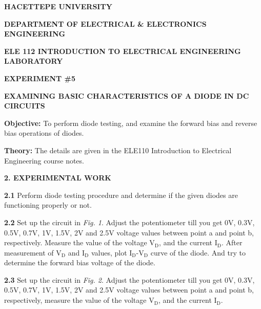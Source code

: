 \documentclass{article}
\begin{document}
\large

{\small \textbf{HACETTEPE UNIVERSITY}}

{\small \textbf{DEPARTMENT OF ELECTRICAL \& ELECTRONICS ENGINEERING}} 

{\small \textbf{ELE 112 INTRODUCTION TO ELECTRICAL ENGINEERING LABORATORY}} 

\vspace{4mm}

{\small \textbf{EXPERIMENT \#5}}

\vspace{4mm}

{\small \textbf{EXAMINING BASIC CHARACTERISTICS OF A DIODE IN DC CIRCUITS}}

\vspace{4mm}

{\textbf{Objective:}}
{To perform diode testing, and examine the forward bias and reverse bias operations of 
diodes.}

\vspace{4mm}

{\textbf{Theory:}}
{The details are given in the ELE110 Introduction to Electrical Engineering course 
notes.}

\vspace{4mm}

{\Large \textbf{2. EXPERIMENTAL WORK}}

\vspace{4mm}

{\textbf{2.1} Perform diode testing procedure and determine if the given diodes are functioning properly or not.}

\vspace{4mm}

{\textbf{2.2} Set up the circuit in \textit{Fig. 1}. Adjust the potentiometer till you get 0V, 0.3V, 0.5V, 0.7V, 1V, 1.5V, 2V and 2.5V voltage values between point a and point b, respectively. Measure the value of the voltage V$_\text{D}$, and the current I$_\text{D}$. After measurement of V$_\text{D}$ and I$_\text{D}$ values, plot I$_\text{D}$-V$_\text{D}$ curve of the diode. And try to determine the forward bias voltage of the diode.}

\vspace{4mm}

{\textbf{2.3} Set up the circuit in \textit{Fig. 2}. Adjust the potentiometer till you get 0V, 0.3V, 0.5V, 0.7V, 1V, 1.5V, 2V and 2.5V voltage values between point a and point b, respectively, measure the value of the voltage V$_\text{D}$, and the current I$_\text{D}$.}
\end{document}
